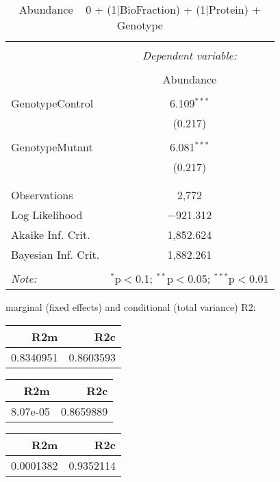 \documentclass[11pt]{report}
\begin{document}
\begin{table}[!htbp] \centering 
  \caption{Abundance ~ 0 + (1|BioFraction) + (1|Protein) + Genotype} 
  \label{} 
\begin{tabular}{@{\extracolsep{5pt}}lc} 
\\[-1.8ex]\hline 
\hline \\[-1.8ex] 
 & \multicolumn{1}{c}{\textit{Dependent variable:}} \\ 
\cline{2-2} 
\\[-1.8ex] & Abundance \\ 
\hline \\[-1.8ex] 
 GenotypeControl & 6.109$^{***}$ \\ 
  & (0.217) \\ 
  & \\ 
 GenotypeMutant & 6.081$^{***}$ \\ 
  & (0.217) \\ 
  & \\ 
\hline \\[-1.8ex] 
Observations & 2,772 \\ 
Log Likelihood & $-$921.312 \\ 
Akaike Inf. Crit. & 1,852.624 \\ 
Bayesian Inf. Crit. & 1,882.261 \\ 
\hline 
\hline \\[-1.8ex] 
\textit{Note:}  & \multicolumn{1}{r}{$^{*}$p$<$0.1; $^{**}$p$<$0.05; $^{***}$p$<$0.01} \\ 
\end{tabular} 
\end{table} 
marginal (fixed effects) and conditional (total variance) R2:

\begin{tabular}{r|r}
\hline
R2m & R2c\\
\hline
0.8340951 & 0.8603593\\
\hline
\end{tabular}

\begin{tabular}{r|r}
\hline
R2m & R2c\\
\hline
8.07e-05 & 0.8659889\\
\hline
\end{tabular}

\begin{tabular}{r|r}
\hline
R2m & R2c\\
\hline
0.0001382 & 0.9352114\\
\hline
\end{tabular}
\end{document}
